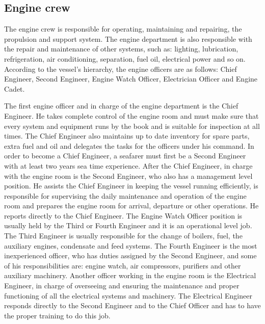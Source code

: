 \subsection{Engine crew}
The engine crew is responsible for operating, maintaining and repairing, the propulsion and support system. The engine department is also responsible with the repair and maintenance of other systems, such as: lighting, lubrication, refrigeration, air conditioning, separation, fuel oil, electrical power and so on.
According to the vessel’s hierarchy, the engine officers are as follows: Chief Engineer, Second Engineer, Engine Watch Officer, Electrician Officer and Engine Cadet.

The first engine officer and in charge of the engine department is the Chief Engineer. He takes complete control of the engine room and must make sure that every system and equipment runs by the book and is suitable for inspection at all times. The Chief Engineer also maintains up to date inventory for spare parts, extra fuel and oil and delegates the tasks for the officers under his command. In order to become a Chief Engineer, a seafarer must first be a Second Engineer with at least two years sea time experience.
After the Chief Engineer, in charge with the engine room is the Second Engineer, who also has a management level position. He assists the Chief Engineer in keeping the vessel running efficiently, is responsible for supervising the daily maintenance and operation of the engine room and prepares the engine room for arrival, departure or other operations. He reports directly to the Chief Engineer.
The Engine Watch Officer position is usually held by the Third or Fourth Engineer and it is an operational level job. The Third Engineer is usually responsible for the change of boilers, fuel, the auxiliary engines, condensate and feed systems. The Fourth Engineer is the most inexperienced officer, who has duties assigned by the Second Engineer, and some of his responsibilities are: engine watch, air compressors, purifiers and other auxiliary machinery.
Another officer working in the engine room is the Electrical Engineer, in charge of overseeing and ensuring the maintenance and proper functioning of all the electrical systems and machinery. The Electrical Engineer responds directly to the Second Engineer and to the Chief Officer and has to have the proper training to do this job.

